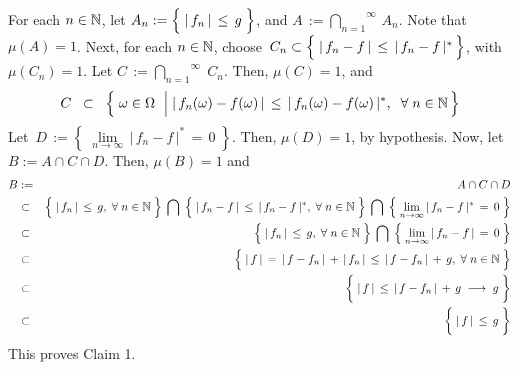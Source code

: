 For each $n\in\mathbb{N}$, let $A_{n} := \left\{\;\vert\,f_{n}\,\vert \,\overset{{\color{white}.}}{\leq}\, g\;\right\}$,
and $A \,:= \overset{\infty}{\underset{n=1}{\bigcap}}\,A_{n}$.
Note that $\mu(A) = 1$.
Next, for each $n\in\mathbb{N}$, choose
\,$C_{n} \subset \left\{\;\vert\,f_{n} - f\,\vert \,\overset{{\color{white}.}}{\leq}\, \vert\,f_{n} - f\,\vert^{*}\,\right\}$,
with $\mu(C_{n}) = 1$. Let $C \,:= \overset{\infty}{\underset{n=1}{\bigcap}}\;C_{n}$. Then, $\mu(C) = 1$, and
\begin{equation*}
C \;\;\subset\;\;
	\left\{\;
	\omega \in \Omega
	\;\,\left\vert\;
	\vert\,f_{n}(\omega) - f(\omega)\,\vert \,\overset{{\color{white}.}}{\leq}\, \vert\,f_{n}(\omega) - f(\omega)\,\vert^{*},
	\right.
	\;\forall\;n\in\N
	\,\right\}
\end{equation*}
Let \,$D \,:= \left\{\;\underset{n\rightarrow\infty}{\lim}\,\vert\,f_{n} - f\,\vert^{*}\,=\,0\;\right\}$.
Then, $\mu(D) = 1$, by hypothesis.
Now, let $B := A \cap C \cap D$. Then, $\mu(B) = 1$ and 
\begin{eqnarray*}
B
&:=&
	A \cap C \cap D
\\
& \subset &
	\left\{\;\vert\,f_{n}\,\vert \,\overset{{\color{white}.}}{\leq}\, g,\;\forall\;n\in\N\;\right\}
	\;\bigcap\;
	\left\{\;\vert\,f_{n} - f\,\vert \,\overset{{\color{white}.}}{\leq}\, \vert\,f_{n} - f\,\vert^{*},\;\forall\;n\in\N\;\right\}
	\;\bigcap\;
	\left\{\;\underset{n\rightarrow\infty}{\lim}\,\vert\,f_{n} - f\,\vert^{*}\,=\,0\;\right\}
\\
& \subset &
	\left\{\;\vert\,f_{n}\,\vert \,\overset{{\color{white}.}}{\leq}\, g,\;\forall\;n\in\N\;\right\}
	\;\bigcap\;
	\left\{\;\underset{n\rightarrow\infty}{\lim}\,\vert\,f_{n} - f\,\vert\,=\,0\;\right\}
\\
& \subset &
	\left\{\;
		\vert\,f\,\vert
		\,\overset{{\color{white}+}}{=}\,
		\vert\,f - f_{n}\,\vert\,+\,\vert\,f_{n}\,\vert
		\,\leq\,
		\vert\,f - f_{n}\,\vert\,+\,g,
		\;\forall\;n\in\N
	\;\right\}
\\
& \subset &
	\left\{\;
		\vert\,f\,\vert
		\,\overset{{\color{white}+}}{\leq}\,
		\vert\,f - f_{n}\,\vert\,+\,g
		\;\longrightarrow\;
		g
	\;\right\}
\\
& \subset &
	\left\{\;
		\vert\,f\,\vert
		\,\overset{{\color{white}+}}{\leq}\,
		g
	\;\right\}
\end{eqnarray*}
This proves Claim 1.

